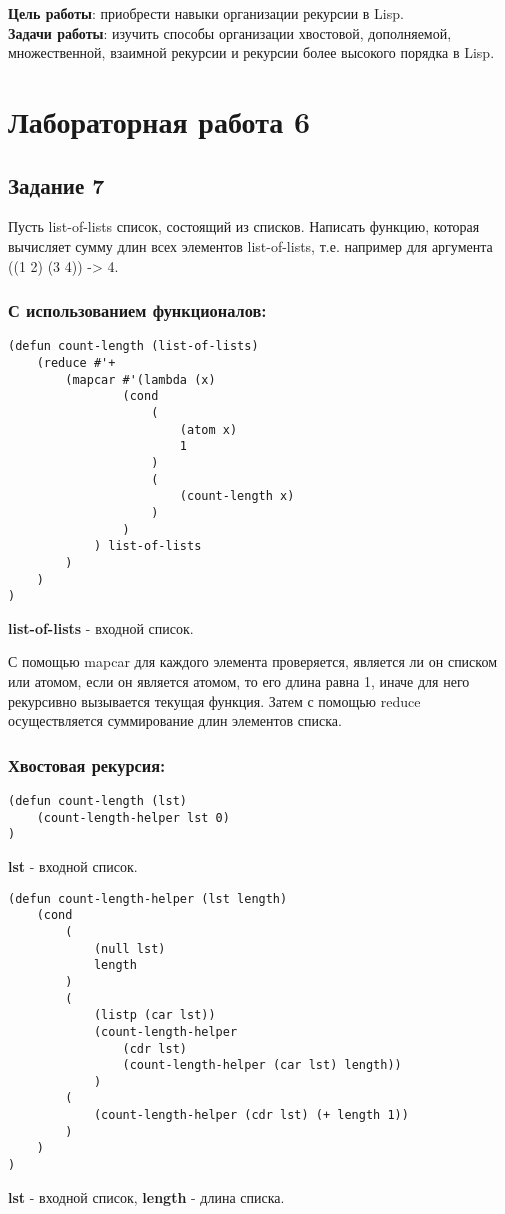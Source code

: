 \documentclass[a4paper,12pt]{article}
\begin{document}
	


\textbf{Цель работы}: приобрести навыки организации рекурсии в Lisp.\\

\textbf{Задачи работы}: изучить способы организации хвостовой, дополняемой, множественной, взаимной рекурсии и рекурсии более высокого порядка в Lisp.

\section*{Лабораторная работа 6}

\subsection*{Задание 7}

Пусть list-of-lists список, состоящий из списков. Написать функцию, которая вычисляет сумму длин всех элементов list-of-lists, т.е. например для аргумента ((1 2) (3 4)) -> 4.

\subsubsection*{С использованием функционалов:}
\begin{lstlisting}[caption=Функция вычисления суммарной длины списков]
(defun count-length (list-of-lists)
	(reduce #'+
		(mapcar #'(lambda (x)
				(cond
					(
						(atom x)
						1
					)
					(
						(count-length x)
					)
				)
			) list-of-lists
		)
	)
)
\end{lstlisting}
\textbf{list-of-lists} - входной список.

С помощью mapcar для каждого элемента проверяется, является ли он списком или атомом, если он является атомом, то его длина равна 1, иначе для него рекурсивно вызывается текущая функция. Затем с помощью reduce осуществляется суммирование длин элементов списка.

\subsubsection*{Хвостовая рекурсия:}
\begin{lstlisting}[caption=Функция-обертка для вычисления суммарной длины списков]
(defun count-length (lst)
	(count-length-helper lst 0)
)
\end{lstlisting}
\textbf{lst} - входной список.
\begin{lstlisting}[caption=Функция для вычисления суммарной длины списков]
 (defun count-length-helper (lst length)
	(cond	
		(
			(null lst) 
			length
		)
		(
			(listp (car lst)) 
			(count-length-helper 
				(cdr lst) 
				(count-length-helper (car lst) length)) 
			)
		(
			(count-length-helper (cdr lst) (+ length 1))
		)
	)
)
\end{lstlisting}
\textbf{lst} - входной список, \textbf{length} - длина списка.
\end{document}
